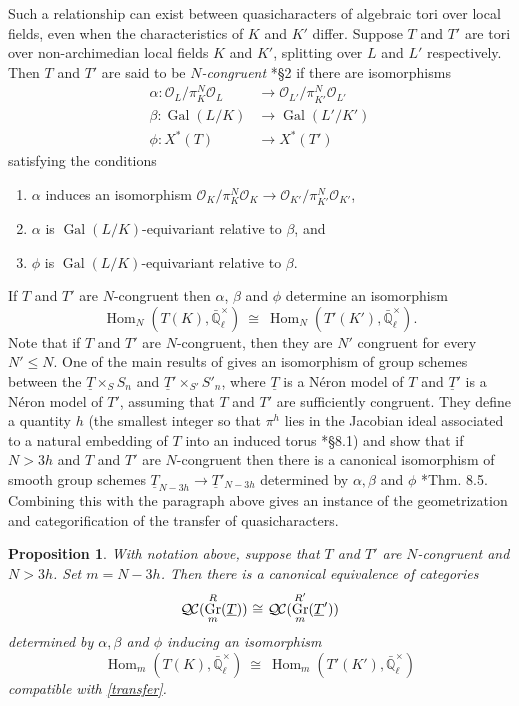 \documentclass{amsart}
\theoremstyle{plain}
\newtheorem{proposition}[theorem]{Proposition}
\theoremstyle{definition}
\theoremstyle{remark}
\newcommand{\EE}{\mathbb{\bar Q}_\ell}
\newcommand{\OK}{\mathcal{O}_K}
\newcommand{\OL}{\mathcal{O}_L}
\newcommand{\OO}[1]{\mathcal{O}_{#1}}
\newcommand{\EEx}{\EE^\times}
\DeclareMathOperator{\Gal}{Gal}
\DeclareMathOperator{\Hom}{Hom}
\DeclareMathOperator{\Gr}{Gr}
\newcommand{\iso}{{\ \cong\ }}
\newcommand{\QC}{{\mathcal{Q\hskip-0.8pt C}}}
\begin{document}
Such a relationship can exist between quasicharacters of algebraic tori over local fields, even when the characteristics of $K$ and $K'$ differ.
Suppose $T$ and $T'$ are tori over non-archimedian local fields $K$ and $K'$,
splitting over $L$ and $L'$ respectively.
Then $T$ and $T'$ are said to be \emph{$N$-congruent} \cite{chai-yu:01a}*{\S 2} if there are isomorphisms
 \begin{align*}
  \alpha : \OL/\pi_K^N \OL &\to \OO{L'}/\pi_{K'}^N \OO{L'} \\
  \beta : \Gal(L/K) &\to \Gal(L'/K') \\
  \phi : X^*(T) &\to X^*(T')
 \end{align*}
 satisfying the conditions
 \begin{enumerate}
  \item $\alpha$ induces an isomorphism $\OK/\pi_K^N \OK \to \OO{K'}/\pi_{K'}^N \OO{K'}$,
  \item $\alpha$ is $\Gal(L/K)$-equivariant relative to $\beta$, and
  \item $\phi$ is $\Gal(L/K)$-equivariant relative to $\beta$.
 \end{enumerate}
If $T$ and $T'$ are $N$-congruent then $\alpha$, $\beta$ and $\phi$ determine an isomorphism 
\begin{equation}\label{transfer}
  \Hom_N(T(K), \EEx) \iso \Hom_N(T'(K'),\EEx).
\end{equation}
Note that if $T$ and $T'$ are $N$-congruent, then they are $N'$ congruent for every
$N' \leq N$.
%
One of the main results of \cite{chai-yu:01a} gives an isomorphism of group schemes between the
$\underline{T} \times_S S_n$ and $\underline{T}' \times_{S'} S'_n$, where $\underline{T}$ is a Néron model of $T$ and $\underline{T}'$ is a Néron model of $T'$, assuming that $T$ and $T'$ are sufficiently congruent.
They define a quantity $h$ (the smallest integer so that $\pi^h$ lies in the
Jacobian ideal associated to a natural embedding of $T$ into an induced torus \cite{chai-yu:01a}*{\S 8.1}) and show  that if $N > 3h$ and $T$ and $T'$ are $N$-congruent then there is a canonical isomorphism of smooth group schemes
 $
 \underline{T}_{N-3h} \to \underline{T}'_{N-3h}
 $
 determined by $\alpha, \beta$ and $\phi$ \cite{chai-yu:01a}*{Thm. 8.5}.
Combining this with the paragraph above gives an instance of the geometrization and categorification of the transfer of quasicharacters.

\begin{proposition}\label{prop:transfer}
 With notation above, suppose that $T$ and $T'$ are $N$-congruent and $N > 3h$.  Set $m = N-3h$.
 Then there is a canonical equivalence of categories
 \[
 \QC(\Gr^{R}_m(\underline{T})) \iso \QC(\Gr^{R'}_m(\underline{T}'))
 \]
 determined by $\alpha, \beta$ and $\phi$ inducing an isomorphism
 \[
\Hom_m(T(K), \EEx) \iso  \Hom_m(T'(K'), \EEx)
 \]
compatible with \eqref{transfer}.%
\end{proposition}



\end{document}
